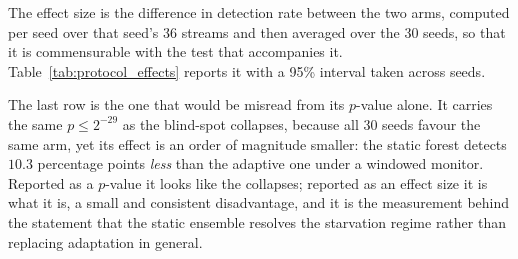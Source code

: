 The effect size is the difference in detection rate between the two arms, computed per seed over
that seed's 36 streams and then averaged over the 30 seeds, so that it is commensurable with the
test that accompanies it. Table~\ref{tab:protocol_effects} reports it with a 95\% interval taken
across seeds.

\begin{table}[t]
  \centering
  \caption{Effect sizes for the seed-level contrasts of Section~\ref{sec:experiments}. $\Delta$ is
  the mean over 30 seeds of the within-seed detection-rate difference (36 streams per seed), in
  percentage points, with its 95\% seed-level interval. Every contrast listed separates completely
  and reports $p \le 2^{-29}$; the $p$-value is identical across rows by construction, the effect
  size is not.}
  \label{tab:protocol_effects}
\end{table}

The last row is the one that would be misread from its $p$-value alone. It carries the same
$p \le 2^{-29}$ as the blind-spot collapses, because all 30 seeds favour the same arm, yet its
effect is an order of magnitude smaller: the static forest detects $10.3$ percentage points
\emph{less} than the adaptive one under a windowed monitor. Reported as a $p$-value it looks like
the collapses; reported as an effect size it is what it is, a small and consistent disadvantage,
and it is the measurement behind the statement that the static ensemble resolves the starvation
regime rather than replacing adaptation in general.

